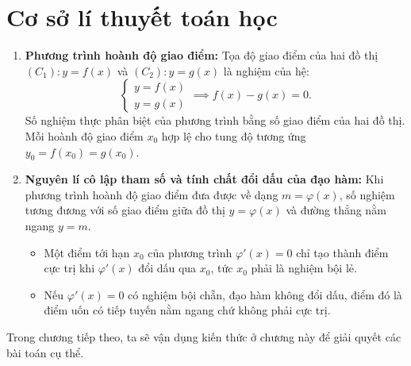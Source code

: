 \section{Cơ sở lí thuyết toán học}

\begin{enumerate}
    \item \textbf{Phương trình hoành độ giao điểm:} 
    Tọa độ giao điểm của hai đồ thị $(C_1): y = f(x)$ và $(C_2): y = g(x)$ là nghiệm của hệ:
    \begin{equation}
        \begin{cases} y = f(x) \\ y = g(x) \end{cases} \implies f(x) - g(x) = 0.
    \end{equation}
    Số nghiệm thực phân biệt của phương trình bằng số giao điểm của hai đồ thị. Mỗi hoành độ giao điểm $x_0$ hợp lệ cho tung độ tương ứng $y_0 = f(x_0) = g(x_0)$.
    
    \item \textbf{Nguyên lí cô lập tham số và tính chất đổi dấu của đạo hàm:} 
    Khi phương trình hoành độ giao điểm đưa được về dạng $m = \varphi(x)$, số nghiệm tương đương với số giao điểm giữa đồ thị $y = \varphi(x)$ và đường thẳng nằm ngang $y = m$. 
    \begin{itemize}
        \item Một điểm tới hạn $x_0$ của phương trình $\varphi'(x) = 0$ chỉ tạo thành điểm cực trị khi $\varphi'(x)$ đổi dấu qua $x_0$, tức $x_0$ phải là nghiệm bội lẻ.
        \item Nếu $\varphi'(x) = 0$ có nghiệm bội chẵn, đạo hàm không đổi dấu, điểm đó là điểm uốn có tiếp tuyến nằm ngang chứ không phải cực trị.
    \end{itemize}
\end{enumerate}
Trong chương tiếp theo, ta sẽ vận dụng kiến thức ở chương này để giải quyết các bài toán cụ thể.